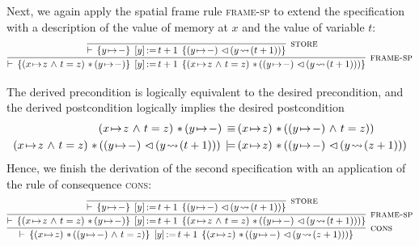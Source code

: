 \documentclass[11pt]{report}
\begin{document}
Next, we again apply the spatial frame rule \textsc{frame-sp} to extend the specification with a description of the value of memory at $x$ and the value of variable $t$: 
\[ \infer[\textsc{frame-sp}]{\triple{(x \fpointsto z \conj t = z) \fsep (y \fpointsto -)}{\cstore{y}{t+1}}{(x \fpointsto z \conj t = z) \fsep ((y \fpointsto -) \fseq (y \fwriteu (t+1)))}}{
  \infer[\textsc{store}]{\triple{y \fpointsto -}{\cstore{y}{t+1}}{(y \fpointsto -) \fseq (y \fwriteu (t+1))}}{}
  } \]

The derived precondition is logically equivalent to the desired precondition, and the derived postcondition logically implies the desired postcondition \begin{align*}
(x \fpointsto z \conj t = z) \fsep (y \fpointsto -) \sequiv & (x \fpointsto z) \fsep ((y \fpointsto -) \conj t = z))\\ 
(x \fpointsto z \conj t = z) \fsep ((y \fpointsto -) \fseq (y \fwriteu (t+1))) \sentails & (x \fpointsto z) \fsep ((y \fpointsto -) \fseq (y \fwriteu (z+1)))
\end{align*} Hence, we finish the derivation of the second specification with an application of the rule of consequence \textsc{cons}: 
\[ \infer[\textsc{cons}]{\triple{(x \fpointsto z) \fsep ((y \fpointsto -) \conj t = z)}{\cstore{y}{t+1}}{(x \fpointsto z) \fsep ((y \fpointsto -) \fseq (y \fwriteu (z+1)))}}{\infer[\textsc{frame-sp}]{\triple{(x \fpointsto z \conj t = z) \fsep (y \fpointsto -)}{\cstore{y}{t+1}}{(x \fpointsto z \conj t = z) \fsep ((y \fpointsto -) \fseq (y \fwriteu (t+1)))}}{
  \infer[\textsc{store}]{\triple{y \fpointsto -}{\cstore{y}{t+1}}{(y \fpointsto -) \fseq (y \fwriteu (t+1))}}{}
  }}
 \]
\end{document}
